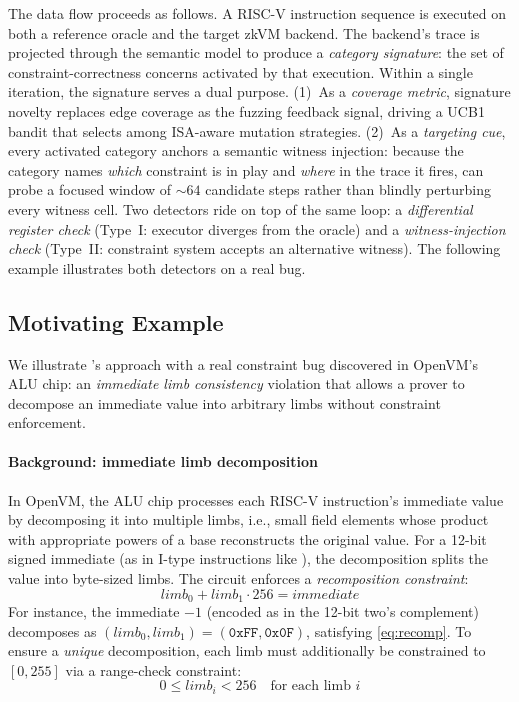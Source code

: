 The data flow proceeds as follows. A RISC-V instruction sequence is executed on both a reference oracle and the target zkVM backend. The backend's trace is projected through the semantic model to produce a \emph{category signature}: the set of constraint-correctness concerns activated by that execution. Within a single iteration, the signature serves a dual purpose. (1)~As a \emph{coverage metric}, signature novelty replaces edge coverage as the fuzzing feedback signal, driving a UCB1 bandit that selects among  ISA-aware mutation strategies. (2)~As a \emph{targeting cue}, every activated category anchors a semantic witness injection: because the category names \emph{which} constraint is in play and \emph{where} in the trace it fires, \tool can probe a focused window of $\sim$$64$ candidate steps rather than blindly perturbing every witness cell. Two detectors ride on top of the same loop: a \emph{differential register check} (Type~I: executor diverges from the oracle) and a \emph{witness-injection check} (Type~II: constraint system accepts an alternative witness). The following example illustrates both detectors on a real bug.

\subsection{Motivating Example}\label{sec:motivating-example}

We illustrate \tool's approach with a real constraint bug discovered in OpenVM's ALU chip: an \emph{immediate limb consistency} violation that allows a prover to decompose an immediate value into arbitrary limbs without constraint enforcement.

\paragraph{Background: immediate limb decomposition}
In OpenVM, the ALU chip processes each RISC-V instruction's immediate value by decomposing it into multiple limbs, i.e., small field elements whose product with appropriate powers of a base reconstructs the original value. For a 12-bit signed immediate (as in I-type instructions like ), the decomposition splits the value into byte-sized limbs. The circuit enforces a \emph{recomposition constraint}:
\begin{equation}\label{eq:recomp}
\mathit{limb}_0 + \mathit{limb}_1 \cdot 256 = \mathit{immediate}
\end{equation}
For instance, the immediate $-1$ (encoded as  in the 12-bit two's complement) decomposes as $(\mathit{limb}_0, \mathit{limb}_1) = (\texttt{0xFF}, \texttt{0x0F})$, satisfying \autoref{eq:recomp}. To ensure a \emph{unique} decomposition, each limb must additionally be constrained to $[0, 255]$ via a range-check constraint:
\begin{equation}\label{eq:range}
0 \leq \mathit{limb}_i < 256 \quad \text{for each limb } i
\end{equation}


